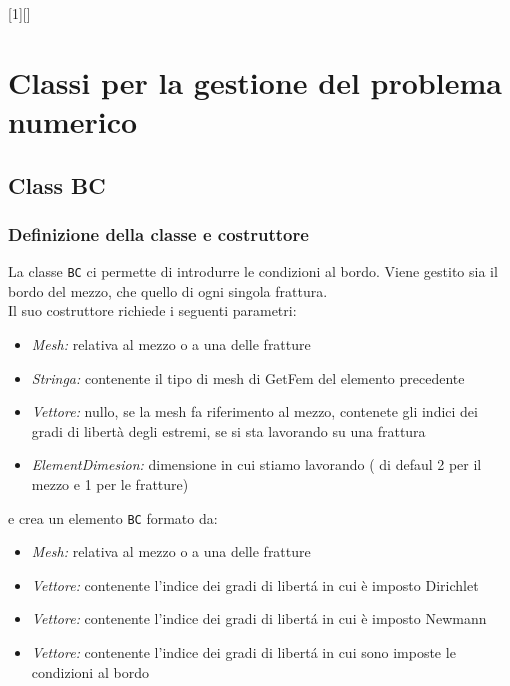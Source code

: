 [1][]{}{}

\chapter{Classi per la gestione del problema numerico}
\section{Class BC}
\subsection{Definizione della classe e costruttore}
La classe \texttt{BC} ci permette di introdurre le condizioni al bordo. Viene gestito sia il bordo del 		mezzo, che quello di ogni singola frattura. \\ 
Il suo costruttore richiede i seguenti parametri:
	\begin{itemize}
	\item \textit{Mesh:} relativa al mezzo o a una delle fratture
	\item \textit{Stringa:} contenente il tipo di mesh di GetFem del elemento precedente
	\item \textit{Vettore:} nullo, se la mesh fa riferimento al mezzo, contenete gli indici dei gradi di libert\`{a} degli estremi, se si sta lavorando su una frattura
	\item \textit{ElementDimesion:} dimensione in cui stiamo lavorando ( di defaul 2 per il mezzo e 1 per le fratture)
	\end{itemize}
e crea un elemento \texttt{BC} formato da:
	\begin{itemize}
	\item \textit{Mesh:} relativa al mezzo o a una delle fratture
	\item \textit{Vettore:} contenente l'indice dei gradi di libert\'{a} in cui è imposto Dirichlet
	\item \textit{Vettore:} contenente l'indice dei gradi di libert\'{a} in cui è imposto Newmann
	\item \textit{Vettore:} contenente l'indice dei gradi di libert\'{a} in cui sono imposte le condizioni al bordo
	\end{itemize} 

